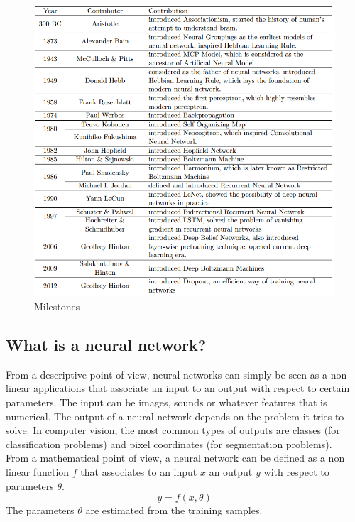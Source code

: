 \begin{figure}[!h]
\centering
\includegraphics[width=1\textwidth, keepaspectratio=true]{./figures/history.png}
\caption{Milestones }
\label{history}
\end{figure}

 
\subsection{What is a neural network?}
\label{what_is_a_neural_network}

From a descriptive point of view, neural networks can simply be seen as a non linear applications that associate an input to an output with respect to certain parameters. The input can be images, sounds or whatever features that is numerical. The output of a neural network depends on the problem it tries to solve. In computer vision, the most common types of outputs  are classes (for classification problems) and pixel coordinates (for segmentation problems).\\
From a mathematical point of view, a neural network can be defined as a non linear function $f$ that associates to an input $x$ an output $y$ with respect to parameters $\theta$.
\begin{equation}
y = f(x,\theta)
\end{equation}
The parameters $\theta$ are estimated from the training samples.





